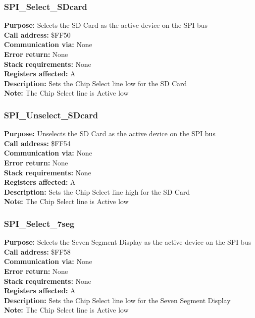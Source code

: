 \pagebreak

\subsubsection{SPI\_Select\_SDcard}
\textbf{Purpose:} Selects the SD Card as the active device on the SPI bus\\
\textbf{Call address:} \$FF50\\
\textbf{Communication via:} None\\
\textbf{Error return:} None\\
\textbf{Stack requirements:} None\\
\textbf{Registers affected:} A\\
\textbf{Description:} Sets the Chip Select line low for the SD Card\\
\textbf{Note:} The Chip Select line is Active low\\ 


\subsubsection{SPI\_Unselect\_SDcard}
\textbf{Purpose:} Unselects the SD Card as the active device on the SPI bus\\
\textbf{Call address:} \$FF54\\
\textbf{Communication via:} None\\
\textbf{Error return:} None\\
\textbf{Stack requirements:} None\\
\textbf{Registers affected:} A\\
\textbf{Description:} Sets the Chip Select line high for the SD Card\\ 
\textbf{Note:} The Chip Select line is Active low\\ 


\subsubsection{SPI\_Select\_7seg}
\textbf{Purpose:} Selects the Seven Segment Display as the active device on the SPI bus\\
\textbf{Call address:} \$FF58\\
\textbf{Communication via:} None\\
\textbf{Error return:} None\\
\textbf{Stack requirements:} None\\
\textbf{Registers affected:} A\\
\textbf{Description:} Sets the Chip Select line low for the Seven Segment Display\\
\textbf{Note:} The Chip Select line is Active low\\ 

